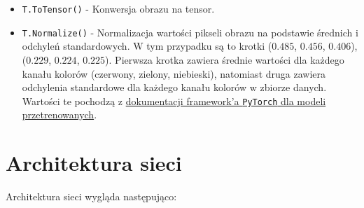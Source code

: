 \documentclass[11pt]{article}
\begin{document}
\begin{itemize}
		\item \texttt{T.ToTensor()} - Konwersja obrazu na tensor.
		\item \texttt{T.Normalize()} - Normalizacja wartości pikseli obrazu na podstawie średnich i odchyleń standardowych. W tym przypadku są to krotki ($0.485$, $0.456$, $0.406$), ($0.229$, $0.224$, $0.225$).
			Pierwsza krotka zawiera średnie wartości dla każdego kanału kolorów (czerwony, zielony, niebieski), natomiast druga zawiera odchylenia standardowe dla każdego kanału kolorów w zbiorze danych.
			Wartości te pochodzą z \href{https://pytorch.org/vision/stable/models.html}{dokumentacji framework'a \texttt{PyTorch} dla modeli przetrenowanych}.
	\end{itemize}

	\section{Architektura sieci}
	Architektura sieci wygląda następująco:
\end{document}
